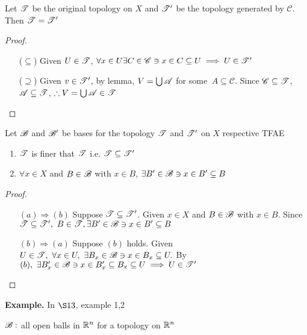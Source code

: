 \begin{rmk*}
	Let $\mathscr{T}$ be the original topology on $X$ and $\mathscr{T}'$ be the topology generated by $\mathscr{C}$. Then $\mathscr{T} = \mathscr{T}'$
\end{rmk*}

\begin{proof}$ $

	\begin{enumerate}
		\item[($\subseteq$)] Given $U \in \mathscr{T}$, $\forall x \in U \exists C \in \mathscr{C} \ni x \in C \subseteq U \implies U \in \mathscr{T}'$
		\item[($\supseteq$)] Given $v \in \mathscr{T}'$, by lemma, $V = \bigcup \mathscr{A}$ for some $\
		A \subseteq \mathscr{C}$. Since $\mathscr{C} \subseteq \mathscr{T}$, $\mathscr{A} \subseteq \mathscr{T}$, $\therefore V = \bigcup \mathscr{A} \in \mathscr{T}$
	\end{enumerate}
\end{proof}

\begin{lmma*}
	Let $\mathscr{B}$ and $\mathscr{B}'$ be bases for the topology $\mathscr{T}$ and $\mathscr{T}'$ on $X$ respective TFAE
	
	\begin{enumerate}
		\item $\mathscr{T}$ is finer that $\mathscr{T}$ i.e. $\mathscr{T} \subseteq \mathscr{T}'$
		\item $\forall x \in X$ and $B \in \mathscr{B}$ with $x \in B$, $\exists B' \in \mathscr{B} \ni x \in B' \subseteq B$
	\end{enumerate}
\end{lmma*}

\begin{proof}$ $
	
	\begin{enumerate}
		\item[$(a)\Rightarrow(b)$]
		Suppose $\mathscr{T} \subseteq \mathscr{T}'$. Given $x \in X$ and $B \in \mathscr{B}$ with $x \in B$. Since $\mathscr{T} \subseteq \mathscr{T}',~B \in \mathscr{T},\exists B' \in \mathscr{B} \ni x \in B' \subseteq B$ 
		\item[$(b)\Rightarrow(a)$] 
		Suppose $(b)$ holds. Given $U \in \mathscr{T},~\forall x \in U,~\exists B_x \in \mathscr{B} \ni x\in B_x \subseteq U.$ By $(b),~\exists B'_x \in \mathscr{B} \ni x\in B_x' \subseteq B_x \subseteq U \implies U \in \mathscr{T}'$
	\end{enumerate}
	
\end{proof}

\textbf{Example. } In $\S 13$, example 1,2

$\mathscr{B}:$ all open balls in $\mathbb{R}^n$ for a topology on $\mathbb{R}^n$


